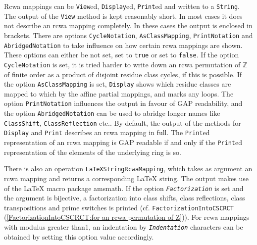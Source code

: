 \documentclass[a4paper,11pt]{report}
\begin{document}
{{     \noindent Rcwa mappings can be \texttt{View}ed, \texttt{Display}ed, \texttt{Print}ed and written to a \texttt{String}. The output of the \texttt{View} method is kept reasonably short. In most cases it does not describe an rcwa
mapping completely. In these cases the output is enclosed in brackets. There
are options \texttt{CycleNotation}, \texttt{AsClassMapping}, \texttt{PrintNotation} and \texttt{AbridgedNotation} to take influence on how certain rcwa mappings are shown. These options can
either be not set, set to \texttt{true} or set to \texttt{false}. If the option \texttt{CycleNotation} is set, it is tried harder to write down an rcwa permutation of
{\ensuremath{\mathbb Z}} of finite order as a product of disjoint residue
class cycles, if this is possible. If the option \texttt{AsClassMapping} is set, \texttt{Display} shows which residue classes are mapped to which by the affine partial
mappings, and marks any loops. The option \texttt{PrintNotation} influences the output in favour of \textsf{GAP} \texttt{} readability, and the option \texttt{AbridgedNotation} can be used to abridge longer names like \texttt{ClassShift}, \texttt{ClassReflection} etc.. By default, the output of the methods for \texttt{Display} and \texttt{Print} describes an rcwa mapping in full. The \texttt{Print}ed representation of an rcwa mapping is \textsf{GAP} \texttt{} readable if and only if the \texttt{Print}ed representation of the elements of the underlying ring is so. 

  There is also an operation \texttt{LaTeXStringRcwaMapping}, which takes as argument an rcwa mapping and returns a corresponding {\LaTeX} string. The output makes use of the {\LaTeX} macro package \textsf{amsmath}. If the option \mbox{\texttt{\mdseries\slshape Factorization}} is set and the argument is bijective, a factorization into class shifts, class
reflections, class transpositions and prime switches is printed (cf. \texttt{FactorizationIntoCSCRCT} (\ref{FactorizationIntoCSCRCT:for an rcwa permutation of Z})). For rcwa mappings with modulus greater than{\nobreakspace}1, an indentation
by \mbox{\texttt{\mdseries\slshape Indentation}} characters can be obtained by setting this option value accordingly. 
\begin{Verbatim}[commandchars=!@|,fontsize=\small,frame=single,label=Example]
  

\end{Verbatim}}}
\end{document}
